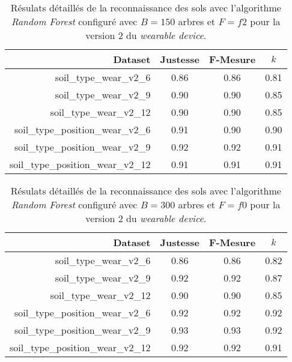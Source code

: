 \begin{table}[H]\renewcommand{\arraystretch}{0.5}
	\centering
	\caption{Résulats détaillés de la reconnaissance des sols avec l'algorithme \textit{Random Forest} configuré avec $B=150$ arbres et $F=f2$ pour la version 2 du \textit{wearable device}.}
	\label{tab:tab:rf-150-f2-wear-v2}
	\begin{tabular}{@{}rccc@{}}
		\toprule
			\textbf{Dataset} & \textbf{Justesse} & \textbf{F-Mesure} & \textbf{$k$} \\
		\midrule
			soil\_type\_wear\_v2\_6 & 0.86 & 0.86 & 0.81 \\
			soil\_type\_wear\_v2\_9 & 0.90 & 0.90 & 0.85 \\
			soil\_type\_wear\_v2\_12 & 0.90 & 0.90 & 0.85 \\
			soil\_type\_position\_wear\_v2\_6 & 0.91 & 0.90 & 0.90 \\
			soil\_type\_position\_wear\_v2\_9 & 0.92 & 0.92 & 0.91 \\
			soil\_type\_position\_wear\_v2\_12 & 0.91 & 0.91 & 0.91 \\
		\bottomrule
	\end{tabular}
\end{table}

\begin{table}[H]\renewcommand{\arraystretch}{0.5}
	\centering
	\caption{Résulats détaillés de la reconnaissance des sols avec l'algorithme \textit{Random Forest} configuré avec $B=300$ arbres et $F=f0$ pour la version 2 du \textit{wearable device}.}
	\label{tab:tab:rf-300-f0-wear-v2}
	\begin{tabular}{@{}rccc@{}}
		\toprule
			\textbf{Dataset} & \textbf{Justesse} & \textbf{F-Mesure} & \textbf{$k$} \\
		\midrule
			soil\_type\_wear\_v2\_6 & 0.86 & 0.86 & 0.82 \\
			soil\_type\_wear\_v2\_9 & 0.92 & 0.92 & 0.87 \\
			soil\_type\_wear\_v2\_12 & 0.90 & 0.90 & 0.85 \\
			soil\_type\_position\_wear\_v2\_6 & 0.92 & 0.92 & 0.92 \\
			soil\_type\_position\_wear\_v2\_9 & 0.93 & 0.93 & 0.92 \\
			soil\_type\_position\_wear\_v2\_12 & 0.92 & 0.92 & 0.91 \\
		\bottomrule
	\end{tabular}
\end{table}

